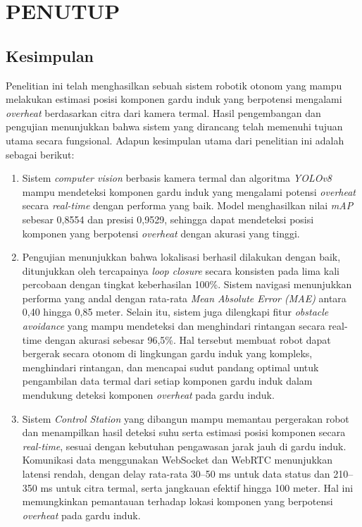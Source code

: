 \chapter{PENUTUP}
\label{chap:penutup}

\section{Kesimpulan}
\label{sec:kesimpulan}
Penelitian ini telah menghasilkan sebuah sistem robotik otonom yang mampu melakukan estimasi posisi komponen gardu induk yang berpotensi mengalami \emph{overheat} berdasarkan citra dari kamera termal. Hasil pengembangan dan pengujian menunjukkan bahwa sistem yang dirancang telah memenuhi tujuan utama secara fungsional. Adapun kesimpulan utama dari penelitian ini adalah sebagai berikut:

\begin{enumerate}[nolistsep]
  \item Sistem \emph{computer vision} berbasis kamera termal dan algoritma \emph{YOLOv8} mampu mendeteksi komponen gardu induk yang mengalami potensi \emph{overheat} secara \emph{real-time} dengan performa yang baik. Model menghasilkan nilai \emph{mAP} sebesar 0{,}8554 dan presisi 0{,}9529, sehingga dapat mendeteksi posisi komponen yang berpotensi \emph{overheat} dengan akurasi yang tinggi.

  \item Pengujian menunjukkan bahwa lokalisasi berhasil dilakukan dengan baik, ditunjukkan oleh tercapainya \emph{loop closure} secara konsisten pada lima kali percobaan dengan tingkat keberhasilan 100\%. Sistem navigasi menunjukkan performa yang andal dengan rata-rata \emph{Mean Absolute Error (MAE)} antara 0{,}40 hingga 0{,}85 meter. Selain itu, sistem juga dilengkapi fitur \emph{obstacle avoidance} yang mampu mendeteksi dan menghindari rintangan secara real-time dengan akurasi sebesar 96{,}5\%. Hal tersebut membuat robot dapat bergerak secara otonom di lingkungan gardu induk yang kompleks, menghindari rintangan, dan mencapai sudut pandang optimal untuk pengambilan data termal dari setiap komponen gardu induk dalam mendukung deteksi komponen \emph{overheat} pada gardu induk.
  

  \item Sistem \emph{Control Station} yang dibangun mampu memantau pergerakan robot dan menampilkan hasil deteksi suhu serta estimasi posisi komponen secara \emph{real-time}, sesuai dengan kebutuhan pengawasan jarak jauh di gardu induk. Komunikasi data menggunakan WebSocket dan WebRTC menunjukkan latensi rendah, dengan delay rata-rata 30–50 ms untuk data status dan 210–350 ms untuk citra termal, serta jangkauan efektif hingga 100 meter. Hal ini memungkinkan pemantauan  terhadap lokasi komponen yang berpotensi \emph{overheat} pada gardu induk.
\end{enumerate}


